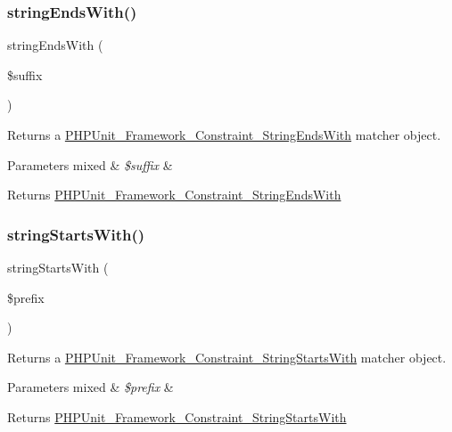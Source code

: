 \subsubsection{\texorpdfstring{string\+Ends\+With()}{stringEndsWith()}}
{\footnotesize\ttfamily string\+Ends\+With (\begin{DoxyParamCaption}\item[{}]{\$suffix }\end{DoxyParamCaption})}

Returns a \mbox{\hyperlink{class_p_h_p_unit___framework___constraint___string_ends_with}{P\+H\+P\+Unit\+\_\+\+Framework\+\_\+\+Constraint\+\_\+\+String\+Ends\+With}} matcher object.


\begin{DoxyParams}[1]{Parameters}
mixed & {\em \$suffix} & \\
\hline
\end{DoxyParams}
\begin{DoxyReturn}{Returns}
\mbox{\hyperlink{class_p_h_p_unit___framework___constraint___string_ends_with}{P\+H\+P\+Unit\+\_\+\+Framework\+\_\+\+Constraint\+\_\+\+String\+Ends\+With}} 
\end{DoxyReturn}
\mbox{\label{_functions_8php_afaa81aac86007c5317666a5b78f9d013}} 
\subsubsection{\texorpdfstring{string\+Starts\+With()}{stringStartsWith()}}
{\footnotesize\ttfamily string\+Starts\+With (\begin{DoxyParamCaption}\item[{}]{\$prefix }\end{DoxyParamCaption})}

Returns a \mbox{\hyperlink{class_p_h_p_unit___framework___constraint___string_starts_with}{P\+H\+P\+Unit\+\_\+\+Framework\+\_\+\+Constraint\+\_\+\+String\+Starts\+With}} matcher object.


\begin{DoxyParams}[1]{Parameters}
mixed & {\em \$prefix} & \\
\hline
\end{DoxyParams}
\begin{DoxyReturn}{Returns}
\mbox{\hyperlink{class_p_h_p_unit___framework___constraint___string_starts_with}{P\+H\+P\+Unit\+\_\+\+Framework\+\_\+\+Constraint\+\_\+\+String\+Starts\+With}} 
\end{DoxyReturn}
\mbox{\label{_functions_8php_afb912a3fd2baac7f6fbaea23ca792819}} 
